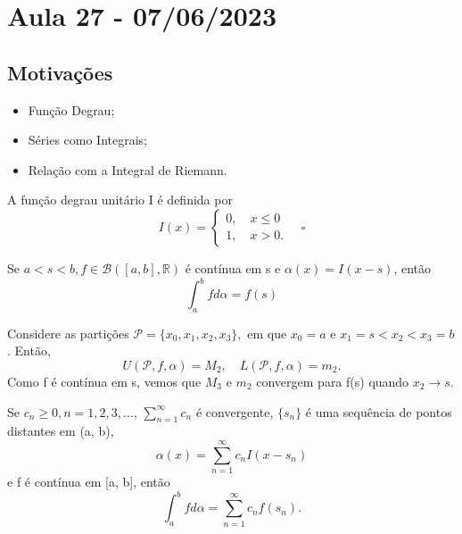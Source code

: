 \documentclass[analysis_notes.tex]{subfiles}
\begin{document}
\section{Aula 27 - 07/06/2023}
\subsection{Motivações}
\begin{itemize}
	\item Função Degrau;
	\item Séries como Integrais;
	\item Relação com a Integral de Riemann.
\end{itemize}
\begin{def*}
	A função degrau unitário I é definida por
	\[
		I(x) = \left\{\begin{array}{ll}
			0,\quad x\leq 0 \\
			1,\quad x > 0.
		\end{array}\right.\quad \square
	\]
\end{def*}
\begin{theorem*}
	Se \(a < s < b, f\in \mathcal{B}([a, b], \mathbb{R})\) é contínua em s e \(\alpha (x) = I(x-s)\), então
	\[
		\int_{a}^{b} f d\alpha = f(s)
	\]
\end{theorem*}
\begin{proof*}
	Considere as partições \(\mathcal{P} = \{x_{0}, x_1, x_2, x_3\},\) em que \(x_{0} = a\) e \(x_1 = s < x_2 < x_3 = b\). Então,
	\[
		U(\mathcal{P}, f, \alpha ) = M_{2}, \quad L(\mathcal{P}, f, \alpha ) = m_{2}.
	\]
	Como f é contínua em s, vemos que \(M_3\) e \(m_2\) convergem para f(s) quando \(x_2\to s.\) \qedsymbol
\end{proof*}
\begin{theorem*}
	Se \(c_{n}\geq 0, n = 1, 2, 3, \dotsc \), \(\sum\limits_{n=1}^{\infty}c_{n}\) é convergente, \(\{s_{n}\}\) é uma sequência de pontos distantes em (a, b),
	\[
		\alpha (x) = \sum\limits_{n=1}^{\infty}c_{n}I(x-s_{n})
	\]
	e f é contínua em [a, b], então
	\[
		\int_{a}^{b}f d\alpha  = \sum\limits_{n=1}^{\infty}c_{n}f(s_{n}).
	\]
\end{theorem*}
\end{document}
